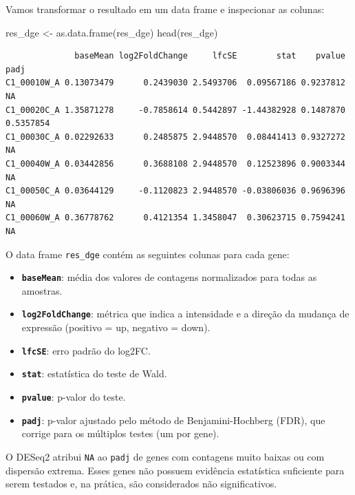 \documentclass[
  letterpaper,
  DIV=11,
  numbers=noendperiod]{scrreprt}
\newenvironment{Shaded}{\begin{snugshade}}{\end{snugshade}}
\newcommand{\FunctionTok}[1]{\textcolor[rgb]{0.28,0.35,0.67}{#1}}
\newcommand{\NormalTok}[1]{\textcolor[rgb]{0.00,0.23,0.31}{#1}}
\newcommand{\OtherTok}[1]{\textcolor[rgb]{0.00,0.23,0.31}{#1}}
\providecommand{\tightlist}{%
  \setlength{\itemsep}{0pt}\setlength{\parskip}{0pt}}
\begin{document}
Vamos transformar o resultado em um data frame e inspecionar as colunas:

\begin{Shaded}
\begin{Highlighting}[]
\NormalTok{res\_dge }\OtherTok{\textless{}{-}} \FunctionTok{as.data.frame}\NormalTok{(res\_dge)}
\FunctionTok{head}\NormalTok{(res\_dge)}
\end{Highlighting}
\end{Shaded}

\begin{verbatim}
              baseMean log2FoldChange     lfcSE        stat    pvalue      padj
C1_00010W_A 0.13073479      0.2439030 2.5493706  0.09567186 0.9237812        NA
C1_00020C_A 1.35871278     -0.7858614 0.5442897 -1.44382928 0.1487870 0.5357854
C1_00030C_A 0.02292633      0.2485875 2.9448570  0.08441413 0.9327272        NA
C1_00040W_A 0.03442856      0.3688108 2.9448570  0.12523896 0.9003344        NA
C1_00050C_A 0.03644129     -0.1120823 2.9448570 -0.03806036 0.9696396        NA
C1_00060W_A 0.36778762      0.4121354 1.3458047  0.30623715 0.7594241        NA
\end{verbatim}

O data frame \texttt{res\_dge} contém as seguintes colunas para cada
gene:

\begin{itemize}
\tightlist
\item
  \textbf{\texttt{baseMean}}: média dos valores de contagens
  normalizados para todas as amostras.
\item
  \textbf{\texttt{log2FoldChange}}: métrica que indica a intensidade e a
  direção da mudança de expressão (positivo = up, negativo = down).
\item
  \textbf{\texttt{lfcSE}}: erro padrão do log2FC.
\item
  \textbf{\texttt{stat}}: estatística do teste de Wald.
\item
  \textbf{\texttt{pvalue}}: p-valor do teste.
\item
  \textbf{\texttt{padj}}: p-valor ajustado pelo método de
  Benjamini-Hochberg (FDR), que corrige para os múltiplos testes (um por
  gene).
\end{itemize}

\begin{tcolorbox}[enhanced jigsaw, arc=.35mm, colframe=quarto-callout-note-color-frame, breakable, bottomrule=.15mm, colback=white, left=2mm, titlerule=0mm, opacityback=0, title=\textcolor{quarto-callout-note-color}{\faInfo}\hspace{0.5em}{Ponto Importante}, leftrule=.75mm, colbacktitle=quarto-callout-note-color!10!white, bottomtitle=1mm, toprule=.15mm, toptitle=1mm, rightrule=.15mm, opacitybacktitle=0.6, coltitle=black]

O DESeq2 atribui \texttt{NA} ao \texttt{padj} de genes com contagens
muito baixas ou com dispersão extrema. Esses genes não possuem evidência
estatística suficiente para serem testados e, na prática, são
considerados não significativos.

\end{tcolorbox}
\end{document}
